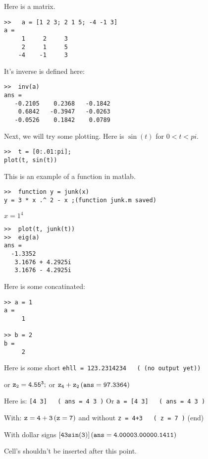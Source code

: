 \documentclass{notebook}
\begin{document}
Here is a matrix.
\begin{verbatim}>>   a = [1 2 3; 2 1 5; -4 -1 3]  
a =
     1     2     3
     2     1     5
    -4    -1     3
\end{verbatim} It's inverse is defined here:
\begin{verbatim}>>  inv(a)  
ans =
   -0.2105    0.2368   -0.1842
    0.6842   -0.3947   -0.0263
   -0.0526    0.1842    0.0789
\end{verbatim}
Next, we will try some plotting.  Here is $\sin(t)$ for $0 < t < pi$.
\begin{verbatim}>>  t = [0:.01:pi];
plot(t, sin(t))\end{verbatim}
This is an example of a function in matlab.
\begin{verbatim}>>  function y = junk(x)
y = 3 * x .^ 2 - x ;(function junk.m saved)\end{verbatim}
$x=1^4$
\begin{verbatim}>>  plot(t, junk(t)) 
>>  eig(a) 
ans =
  -1.3352          
   3.1676 + 4.2925i
   3.1676 - 4.2925i
\end{verbatim}
Here is some concatinated:
\begin{verbatim}>> a = 1  
a =
     1

>> b = 2  
b =
     2
\end{verbatim}

Here is some short
{ \tt  ehll = 123.2314234   \, (
(no output yet))} 

 or
${ \tt z_2 = 4.55^3;  } $ or 
${ \tt  z_4 + z_2   \, (
ans =
   97.3364
)}  $

Here is:
{ \tt  [4  3]   \, (
ans =
     4     3
)} 
Or { \tt  a = [4  3]   \, (
ans =
     4     3
)} 

With: $ { \tt  z = 4+3   \, (
z =
     7
)} $
and without { \tt  z = 4+3   \, (
z =
     7
)} (end)


With dollar signs ${ \tt [4 3 sin(3)]   \, (
ans =
    4.0000    3.0000    0.1411
)} $


Cell's shouldn't be inserted after this point.
\end{document}
